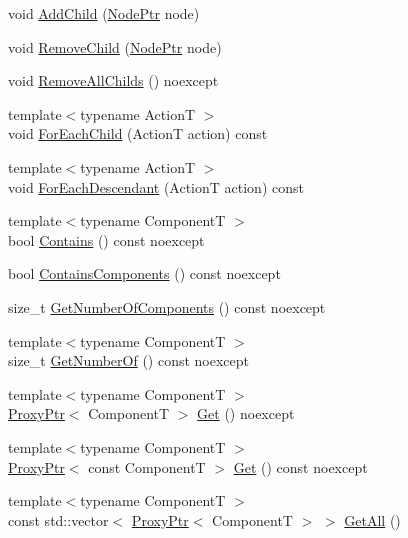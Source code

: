 \begin{DoxyCompactItemize}
\item 
void \hyperlink{classmage_1_1_node_ad2324a1a111548e4b80b8e4cbaba5221}{Add\+Child} (\hyperlink{classmage_1_1_node_ac575dc006e0ae1134277ade977dc06b6}{Node\+Ptr} node)
\item 
void \hyperlink{classmage_1_1_node_a0654443d58730ebc7471626a38c2bc7f}{Remove\+Child} (\hyperlink{classmage_1_1_node_ac575dc006e0ae1134277ade977dc06b6}{Node\+Ptr} node)
\item 
void \hyperlink{classmage_1_1_node_a601804f7da1df59d5f0bd91a68dc7282}{Remove\+All\+Childs} () noexcept
\item 
{\footnotesize template$<$typename ActionT $>$ }\\void \hyperlink{classmage_1_1_node_a3654fe9e087942fb4d3f0657f4f3e521}{For\+Each\+Child} (ActionT action) const
\item 
{\footnotesize template$<$typename ActionT $>$ }\\void \hyperlink{classmage_1_1_node_a6db4a4bc784a20b833d3fc32a4338318}{For\+Each\+Descendant} (ActionT action) const
\item 
{\footnotesize template$<$typename ComponentT $>$ }\\bool \hyperlink{classmage_1_1_node_ab3defd7329e8f87cff65cd8136c8f2d2}{Contains} () const noexcept
\item 
bool \hyperlink{classmage_1_1_node_aafb492896751b5b60ba5ddaeecbdd719}{Contains\+Components} () const noexcept
\item 
size\+\_\+t \hyperlink{classmage_1_1_node_a51d74c74f31d8fcbc0cf6768fd180a8e}{Get\+Number\+Of\+Components} () const noexcept
\item 
{\footnotesize template$<$typename ComponentT $>$ }\\size\+\_\+t \hyperlink{classmage_1_1_node_a0cd486de1639d5af2618ba913124fbe6}{Get\+Number\+Of} () const noexcept
\item 
{\footnotesize template$<$typename ComponentT $>$ }\\\hyperlink{classmage_1_1_proxy_ptr}{Proxy\+Ptr}$<$ ComponentT $>$ \hyperlink{classmage_1_1_node_af514b0282820f1d071fc24a2b815ae82}{Get} () noexcept
\item 
{\footnotesize template$<$typename ComponentT $>$ }\\\hyperlink{classmage_1_1_proxy_ptr}{Proxy\+Ptr}$<$ const ComponentT $>$ \hyperlink{classmage_1_1_node_a597f86bd9faecda719c37c4b2c73231e}{Get} () const noexcept
\item 
{\footnotesize template$<$typename ComponentT $>$ }\\const std\+::vector$<$ \hyperlink{classmage_1_1_proxy_ptr}{Proxy\+Ptr}$<$ ComponentT $>$ $>$ \hyperlink{classmage_1_1_node_aaff260f8a6e8741dc7d56ca1fceb7b0f}{Get\+All} ()

\end{DoxyCompactItemize}
